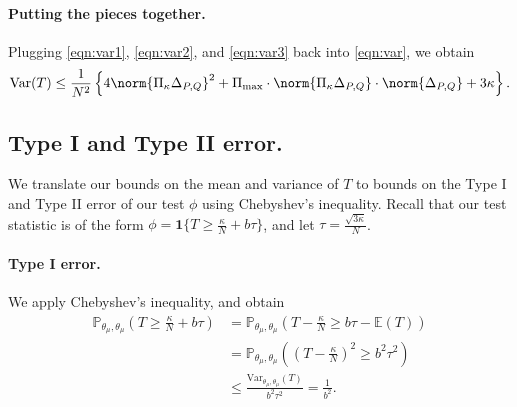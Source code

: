 \documentclass{article}
\newcommand{\Var}{\mathrm{Var}}
\newcommand{\1}{\mathbf{1}}
\newcommand{\Pbb}{\mathbb{P}}
\newcommand{\Ebb}{\mathbb{E}}
\theoremstyle{alden}
\theoremstyle{aldenthm}
\theoremstyle{definition}
\theoremstyle{remark}
\begin{document}
\paragraph{Putting the pieces together.}
Plugging \eqref{eqn:var1}, \eqref{eqn:var2}, and \eqref{eqn:var3} back into \eqref{eqn:var}, we obtain
\begin{equation}
\label{eqn:var_5}
\Var(T) \leq \frac{1}{N^2}\left\{4\norm{\Pi_{\kappa} \Delta_{P,Q}}^2 + \Pi_{\max} \cdot \norm{\Pi_{\kappa} \Delta_{P,Q}} \cdot \norm{\Delta_{P,Q}} + 3\kappa \right\}.
\end{equation}

\subsection{Type I and Type II error.}

We translate our bounds on the mean and variance of $T$ to bounds on the Type I and Type II error of our test $\phi$ using Chebyshev's inequality. Recall that our test statistic is of the form $\phi = \1\{T \geq \frac{\kappa}{N} + b\tau\}$, and let $\tau = \frac{\sqrt{3\kappa}}{N}$. 

\paragraph{Type I error.}
We apply Chebyshev's inequality, and obtain
\begin{align*}
\Pbb_{\theta_{\mu},\theta_{\mu}}\left(T \geq \frac{\kappa}{N} + b\tau\right) & = \Pbb_{\theta_{\mu},\theta_{\mu}}\left(T - \frac{\kappa}{N} \geq b\tau - \Ebb(T)\right) \\
& = \Pbb_{\theta_{\mu},\theta_{\mu}}\left( (T - \frac{\kappa}{N})^2 \geq b^2\tau^2 \right) \\
& \leq \frac{\Var_{\theta_{\mu},\theta_{\mu}}(T)}{b^2\tau^2} = \frac{1}{b^2}.
\end{align*}
\end{document}
